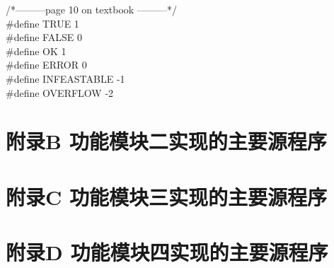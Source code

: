 \documentclass[supercite]{Experimental_Report}
\theoremstyle{definition}
\begin{document}
\noindent
/*---------page 10 on textbook ---------*/\\
\#define TRUE 1\\
\#define FALSE 0\\
\#define OK 1\\
\#define ERROR 0\\
\#define INFEASTABLE -1\\
\#define OVERFLOW -2\\
\newpage
\section{附录B 功能模块二实现的主要源程序}
\newpage
\section{附录C 功能模块三实现的主要源程序}
\newpage
\section{附录D 功能模块四实现的主要源程序}
\end{document}
